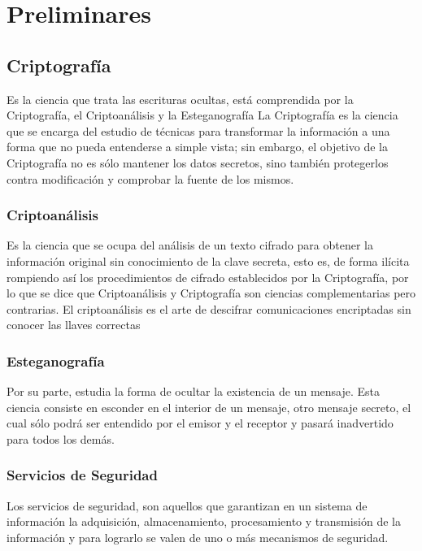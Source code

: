 \chapter{Preliminares} %

\section{Criptografía}
Es la ciencia que trata las escrituras ocultas, está comprendida por la Criptografía, el Criptoanálisis y la Esteganografía
La Criptografía es la ciencia que se encarga del estudio de técnicas para transformar la información a una forma que no pueda entenderse a simple vista; sin embargo, el objetivo de la Criptografía no es sólo mantener los datos secretos, sino también protegerlos contra modificación y comprobar la fuente de los mismos.

\subsection{Criptoanálisis}
Es la ciencia que se ocupa del análisis de un texto cifrado para obtener la información original sin conocimiento de la clave secreta, esto es, de forma ilícita rompiendo así los procedimientos de cifrado establecidos por la Criptografía, por lo que se dice que Criptoanálisis y Criptografía son ciencias complementarias pero contrarias.
El criptoanálisis es el arte de descifrar comunicaciones encriptadas sin conocer las llaves correctas

\subsection{Esteganografía}
 Por su parte, estudia la forma de ocultar la existencia de un mensaje. Esta ciencia consiste en esconder en el interior de un mensaje, otro mensaje secreto, el cual sólo podrá ser entendido por el emisor y el receptor y pasará inadvertido para todos los demás.

\subsection{Servicios de Seguridad}
Los servicios de seguridad, son aquellos que garantizan en un sistema de información la adquisición, almacenamiento, procesamiento y transmisión de la información y para lograrlo se valen de uno o más mecanismos de seguridad.

